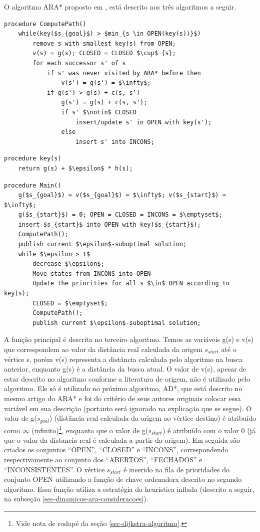 O algoritmo ARA* proposto em , está descrito nos três algoritmos a seguir.

\begin{lstlisting}[mathescape, label=lst-dinamicos-ara-computepath, caption=Algoritmo ARA* - função de cálculo de caminho, float=htpb]
procedure ComputePath()
	while(key($s_{goal}$) > $min_{s \in OPEN(key(s))}$)
		remove s with smallest key(s) from OPEN;
		v(s) = g(s); CLOSED = CLOSED $\cup$ {s};
		for each successor s' of s
			if s' was never visited by ARA* before then
				v(s') = g(s') = $\infty$;
			if g(s') > g(s) + c(s, s')
				g(s') = g(s) + c(s, s');
				if s' $\notin$ CLOSED
					insert/update s' in OPEN with key(s');
				else
					insert s' into INCONS;
\end{lstlisting}

 
\begin{lstlisting}[mathescape, label=lst-dinamicos-ara-key, caption=Algoritmo ARA* - função da chave ordenadora da fila de prioridades, float=htpb]
procedure key(s)
	return g(s) + $\epsilon$ * h(s);
\end{lstlisting}

\begin{lstlisting}[mathescape, label=lst-dinamicos-ara-main, caption=Algoritmo ARA* - função principal, float=htpb]
procedure Main()
	g($s_{goal}$) = v($s_{goal}$) = $\infty$; v($s_{start}$) = $\infty$;
	g($s_{start}$) = 0; OPEN = CLOSED = INCONS = $\emptyset$;
	insert $s_{start}$ into OPEN with key($s_{start}$);
	ComputePath();
	publish current $\epsilon$-suboptimal solution;
	while $\epsilon > 1$
		decrease $\epsilon$;
		Move states from INCONS into OPEN
		Update the priorities for all s $\in$ OPEN according to key(s);
		CLOSED = $\emptyset$;
		ComputePath();
		publish current $\epsilon$-suboptimal solution;
\end{lstlisting}

A função principal é descrita no terceiro algoritmo. Temos as variáveis g(s) e v(s) que correspondem ao valor da distância real calculada da origem $s_{start}$ até o vértice s, porém v(s) representa a distância calculada pelo algoritmo na busca anterior, enquanto g(s) é a distância da busca atual. O valor de v(s), apesar de estar descrito no algoritmo conforme a literatura de origem, não é utilizado pelo algoritmo. Ele só é utilizado no próximo algoritmo, AD*, que está descrito no mesmo artigo do ARA* e foi do critério de seus autores originais colocar essa variável em sua descrição (portanto será ignorado na explicação que se segue). O valor de g($s_{goal}$) (distância real calculada da origem ao vértice destino) é atribuído como $\infty$ (infinito)\footnote{Vide nota de rodapé da seção \ref{sec-dijkstra-algoritmo}.}, enquanto que o valor de g($s_{start}$) é atribuído com o valor 0 (já que o valor da distancia real é calculada a partir da origem). Em seguida são criados os conjuntos ``OPEN'', ``CLOSED'' e ``INCONS'', correspondendo respectivamente ao conjunto dos ``ABERTOS'', ``FECHADOS'' e ``INCONSISTENTES''. O vértice $s_{start}$ é inserido na fila de prioridades do conjunto OPEN utilizando a função de chave ordenadora descrito no segundo algoritmo. Essa função utiliza a estratégia da heurística inflada (descrito a seguir, na subseção \ref{sec-dinamicos-ara-consideracoes}).

